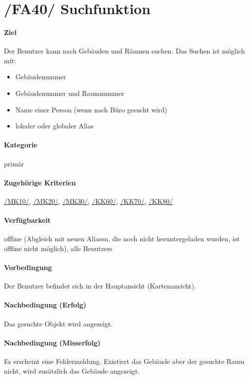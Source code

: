 \section[Suchfunktion]{/FA40/ Suchfunktion}
\label{/FA40/}
\paragraph{Ziel}
Der \Gls{Benutzer} kann nach Gebäuden und Räumen suchen. 
Das Suchen ist möglich mit:
\begin{itemize}
    \item Gebäudenummer
    \item Gebäudenummer und Raumnummer
    \item Name einer Person (wenn nach Büro gesucht wird)
    \item \gls{lokal}er oder \gls{global}er \Gls{Alias}
\end{itemize}

\paragraph{Kategorie}
primär
\paragraph{Zugehörige Kriterien}
\hyperref[/MK10/]{/MK10/}, \hyperref[/MK20/]{/MK20/}, \hyperref[/MK30/]{/MK30/}, \hyperref[/KK60/]{/KK60/}, \hyperref[/KK70/]{/KK70/}, \hyperref[/KK80/]{/KK80/} 
\paragraph{Verfügbarkeit}
\gls{offline} (Abgleich mit neuen \Glspl{Alias}n, die noch nicht heruntergeladen wurden, ist \gls{offline} nicht möglich), alle \Glspl{Benutzer}
\paragraph{Vorbedingung}
Der \Gls{Benutzer} befindet sich in der Hauptansicht (\Gls{Kartenansicht}).
\paragraph{Nachbedingung (Erfolg)}
Das gesuchte Objekt wird angezeigt.
\paragraph{Nachbedingung (Misserfolg)}
Es erscheint eine Fehlermeldung. Existiert das Gebäude aber der gesuchte Raum nicht, wird zusätzlich das Gebäude angezeigt.
